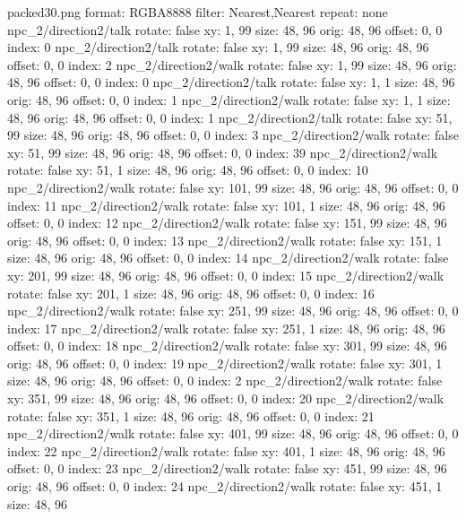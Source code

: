 packed30.png
format: RGBA8888
filter: Nearest,Nearest
repeat: none
npc_2/direction2/talk
  rotate: false
  xy: 1, 99
  size: 48, 96
  orig: 48, 96
  offset: 0, 0
  index: 0
npc_2/direction2/talk
  rotate: false
  xy: 1, 99
  size: 48, 96
  orig: 48, 96
  offset: 0, 0
  index: 2
npc_2/direction2/walk
  rotate: false
  xy: 1, 99
  size: 48, 96
  orig: 48, 96
  offset: 0, 0
  index: 0
npc_2/direction2/talk
  rotate: false
  xy: 1, 1
  size: 48, 96
  orig: 48, 96
  offset: 0, 0
  index: 1
npc_2/direction2/walk
  rotate: false
  xy: 1, 1
  size: 48, 96
  orig: 48, 96
  offset: 0, 0
  index: 1
npc_2/direction2/talk
  rotate: false
  xy: 51, 99
  size: 48, 96
  orig: 48, 96
  offset: 0, 0
  index: 3
npc_2/direction2/walk
  rotate: false
  xy: 51, 99
  size: 48, 96
  orig: 48, 96
  offset: 0, 0
  index: 39
npc_2/direction2/walk
  rotate: false
  xy: 51, 1
  size: 48, 96
  orig: 48, 96
  offset: 0, 0
  index: 10
npc_2/direction2/walk
  rotate: false
  xy: 101, 99
  size: 48, 96
  orig: 48, 96
  offset: 0, 0
  index: 11
npc_2/direction2/walk
  rotate: false
  xy: 101, 1
  size: 48, 96
  orig: 48, 96
  offset: 0, 0
  index: 12
npc_2/direction2/walk
  rotate: false
  xy: 151, 99
  size: 48, 96
  orig: 48, 96
  offset: 0, 0
  index: 13
npc_2/direction2/walk
  rotate: false
  xy: 151, 1
  size: 48, 96
  orig: 48, 96
  offset: 0, 0
  index: 14
npc_2/direction2/walk
  rotate: false
  xy: 201, 99
  size: 48, 96
  orig: 48, 96
  offset: 0, 0
  index: 15
npc_2/direction2/walk
  rotate: false
  xy: 201, 1
  size: 48, 96
  orig: 48, 96
  offset: 0, 0
  index: 16
npc_2/direction2/walk
  rotate: false
  xy: 251, 99
  size: 48, 96
  orig: 48, 96
  offset: 0, 0
  index: 17
npc_2/direction2/walk
  rotate: false
  xy: 251, 1
  size: 48, 96
  orig: 48, 96
  offset: 0, 0
  index: 18
npc_2/direction2/walk
  rotate: false
  xy: 301, 99
  size: 48, 96
  orig: 48, 96
  offset: 0, 0
  index: 19
npc_2/direction2/walk
  rotate: false
  xy: 301, 1
  size: 48, 96
  orig: 48, 96
  offset: 0, 0
  index: 2
npc_2/direction2/walk
  rotate: false
  xy: 351, 99
  size: 48, 96
  orig: 48, 96
  offset: 0, 0
  index: 20
npc_2/direction2/walk
  rotate: false
  xy: 351, 1
  size: 48, 96
  orig: 48, 96
  offset: 0, 0
  index: 21
npc_2/direction2/walk
  rotate: false
  xy: 401, 99
  size: 48, 96
  orig: 48, 96
  offset: 0, 0
  index: 22
npc_2/direction2/walk
  rotate: false
  xy: 401, 1
  size: 48, 96
  orig: 48, 96
  offset: 0, 0
  index: 23
npc_2/direction2/walk
  rotate: false
  xy: 451, 99
  size: 48, 96
  orig: 48, 96
  offset: 0, 0
  index: 24
npc_2/direction2/walk
  rotate: false
  xy: 451, 1
  size: 48, 96
